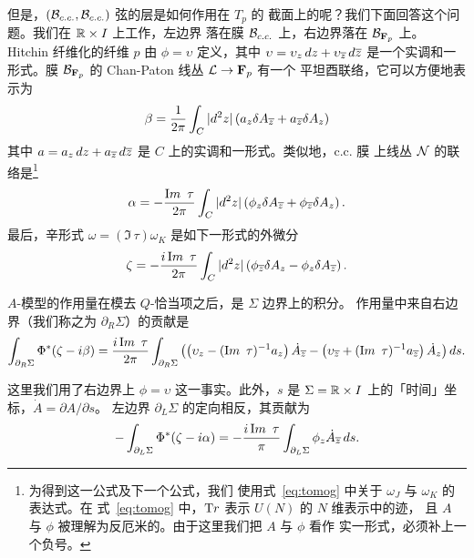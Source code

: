 但是，$({\cal B}_{c.c.},{\cal B}_{c.c.})$ 弦的层是如何作用在 $T_p$ 的
截面上的呢？我们下面回答这个问题。我们在 $\RR\times I$ 上工作，左边界
落在膜 ${\cal B}_{c.c.}$ 上，右边界落在 ${\cal B}_{{\CMF}_p}$ 上。
Hitchin 纤维化的纤维 $p$ 由 $\phi=\upsilon$ 定义，其中
$\upsilon=\upsilon_z\,dz+\upsilon_\bz\,d\bz$ 是一个实调和一形式。膜
${\cal B}_{{\CMF}_p}$ 的 Chan-Paton 线丛 ${\cal L}\to{\CMF}_p$ 有一个
平坦酉联络，它可以方便地表示为 %
\setcounter{equation}{16}
\begin{equation}\label{eq:zoncob}
\beta={1\over
{2\pi}}\int_C |d^2 z|\left(a_z \delta A_\bz+a_\bz \delta
A_z\right)
\end{equation}
 其中 $a=a_z\,dz+a_\bz\,d\bz$ 是 $C$ 上的实调和一形式。类似地，c.c. 膜
上线丛 ${\cal N}$ 的联络是\footnote{为得到这一公式及下一个公式，我们
使用式~\eqref{eq:tomog} 中关于 $\omega_J$ 与 $\omega_K$ 的表达式。在
式~\eqref{eq:tomog} 中，${\rm Tr}$ 表示 $U(N)$ 的 $N$ 维表示中的迹，
且 $A$ 与 $\phi$ 被理解为反厄米的。由于这里我们把 $A$ 与 $\phi$ 看作
实一形式，必须补上一个负号。} %
\setcounter{equation}{17}
\begin{equation}\label{eq:homifly}
\alpha=-{\Im\,\tau\over
2\pi}\int_C |d^2 z|\left(\phi_z \delta A_\bz+\phi_\bz \delta
A_z\right).
\end{equation}
 最后，辛形式 $\omega=({\Im}\,\tau)\omega_K$ 是如下一形式的外微分 %
\setcounter{equation}{18}
\begin{equation}\label{eq:nomigly}
\zeta=-{i\,
\Im\,\tau\over 2\pi}\int_C |d^2 z|\left(\phi_\bz \delta A_z-\phi_z
\delta A_\bz\right).
\end{equation}

$A$-模型的作用量在模去 $Q$-恰当项之后，是 $\Sigma$ 边界上的积分。
作用量中来自右边界（我们称之为 $\partial_R\Sigma$）的贡献是 %
\setcounter{equation}{19}
\begin{equation}\label{eq:omitro}
\int_{\partial_R\Sigma}
\Phi^*(\zeta -i\beta)={i\,\Im\,\tau\over 2\pi}\int_{\partial_R\Sigma}
\left(\left(\upsilon_z-(\Im\,\tau)^{-1}a_z\right) \dot{A}_\bz
-\left(\upsilon_\bz+(\Im\,\tau)^{-1}a_\bz\right) \dot{A}_z\right)ds.
\end{equation}

这里我们用了右边界上 $\phi=\upsilon$ 这一事实。此外，$s$ 是
$\Sigma=\Bbb{R}\times I$ 上的「时间」坐标，$\dot A=\partial A/\partial s$。
左边界 $\partial_L\Sigma$ 的定向相反，其贡献为
\setcounter{equation}{20}
\begin{equation}\label{eq:bofloc}
-\int_{\partial_L\Sigma} \Phi^*(\zeta-i\alpha)=-{i\,\Im\,\tau\over \pi}\int_{\partial_L\Sigma}
 \phi_z
\dot{A}_\bz\,ds.
\end{equation}

